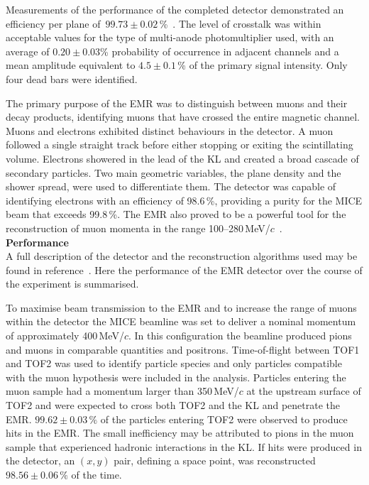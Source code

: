 
Measurements of the performance of the completed detector demonstrated
an efficiency per plane
of~$99.73\pm0.02$\,\%~\cite{2016JInst..11T10007,Drielsma:2017doj}.
The level of crosstalk was within acceptable values for the type of
multi-anode photomultiplier used, with an average of $0.20\pm0.03$\%
probability of occurrence in adjacent channels and a mean amplitude
equivalent to $4.5\pm0.1$\,\% of the primary signal intensity.
Only four dead bars were identified.

The primary purpose of the EMR was to distinguish between muons and
their decay products, identifying muons that have crossed the entire
magnetic channel.
Muons and electrons exhibited distinct behaviours in the detector.
A muon followed a single straight track before either stopping or
exiting the scintillating volume.
Electrons showered in the lead of the KL and created a broad cascade
of secondary particles.
Two main geometric variables, the plane density and the shower spread,
were used to differentiate them.
The detector was capable of identifying electrons with an efficiency
of 98.6\,\%, providing a purity for the MICE beam that exceeds
99.8\,\%.
The EMR also proved to be a powerful tool for the reconstruction of
muon momenta in the range
100--280\,MeV/$c$~\cite{2015JInst..10P2012A}.  \\

\noindent\textbf{Performance} \\
\noindent
A full description of the detector and the reconstruction algorithms
used may be found in reference~\cite{2015JInst..10P2012A}.
Here the performance of the EMR detector over the course of the
experiment is summarised.

To maximise beam transmission to the EMR and to increase the range of
muons within the detector the MICE beamline was set to deliver a
nominal momentum of approximately 400\,MeV/$c$.
In this configuration the beamline produced pions and muons in
comparable quantities and positrons.
Time-of-flight between TOF1 and TOF2 was used to identify particle
species and only particles compatible with the muon hypothesis were
included in the analysis.
Particles entering the muon sample had a momentum larger than
350\,MeV/$c$ at the upstream surface of TOF2 and were expected to
cross both TOF2 and the KL and penetrate the EMR.
$99.62\pm0.03\,\%$ of the particles entering TOF2 were observed to produce
hits in the EMR.
The small inefficiency may be attributed to pions in the muon sample
that experienced hadronic interactions in the KL.
If hits were produced in the detector, an $(x,y)$ pair, defining a
space point, was reconstructed $98.56\pm0.06\,\%$ of the time.

